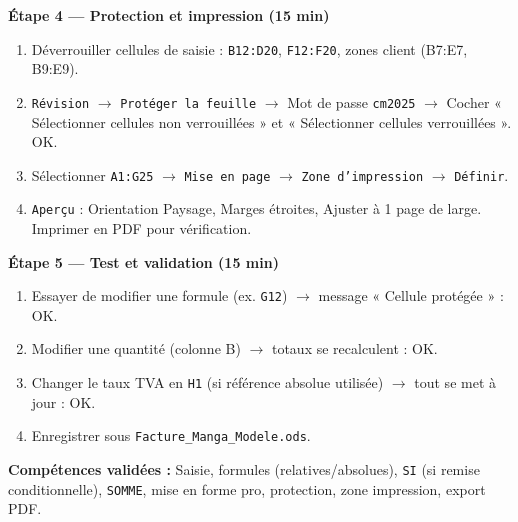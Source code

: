 \documentclass[11pt]{article}
\begin{document}
\begin{experience}
\textbf{Étape 4 — Protection et impression (15 min)}
\begin{enumerate}
\item Déverrouiller cellules de saisie : \texttt{B12:D20}, \texttt{F12:F20}, zones client (B7:E7, B9:E9).
\item \texttt{Révision} $\rightarrow$ \texttt{Protéger la feuille} $\rightarrow$ Mot de passe \texttt{cm2025} $\rightarrow$ Cocher « Sélectionner cellules non verrouillées » et « Sélectionner cellules verrouillées ». OK.
\item Sélectionner \texttt{A1:G25} $\rightarrow$ \texttt{Mise en page} $\rightarrow$ \texttt{Zone d'impression} $\rightarrow$ \texttt{Définir}.
\item \texttt{Aperçu} : Orientation Paysage, Marges étroites, Ajuster à 1 page de large. Imprimer en PDF pour vérification.
\end{enumerate}

\textbf{Étape 5 — Test et validation (15 min)}
\begin{enumerate}
\item Essayer de modifier une formule (ex. \texttt{G12}) $\rightarrow$ message « Cellule protégée » : OK.
\item Modifier une quantité (colonne B) $\rightarrow$ totaux se recalculent : OK.
\item Changer le taux TVA en \texttt{H1} (si référence absolue utilisée) $\rightarrow$ tout se met à jour : OK.
\item Enregistrer sous \texttt{Facture\_Manga\_Modele.ods}.
\end{enumerate}
\textbf{Compétences validées :} Saisie, formules (relatives/absolues), \texttt{SI} (si remise conditionnelle), \texttt{SOMME}, mise en forme pro, protection, zone impression, export PDF.
\end{experience}
\end{document}
